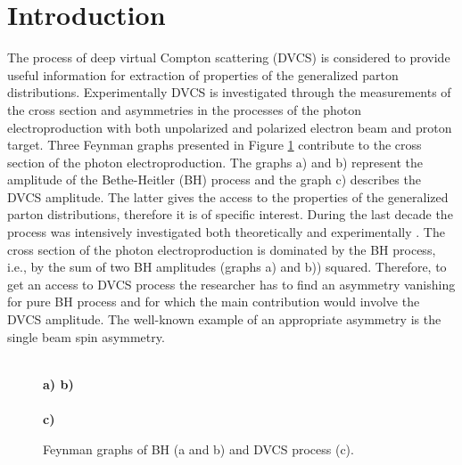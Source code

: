 \documentclass[aps,prd,reprint,groupedaddress,preprintnumbers,showpacs]{revtex4-1}
\begin{document}

\maketitle
\section{\label{Intro}Introduction}

The process of deep virtual Compton scattering
(DVCS) is considered to provide useful information
for extraction of properties of the generalized parton
distributions. Experimentally DVCS is investigated through the measurements of the cross section and asymmetries in the processes of the photon electroproduction with both unpolarized and polarized electron beam and proton target.  Three Feynman graphs presented in Figure \ref{DVCSgraphs} 
contribute
to the cross section of the photon electroproduction. The graphs a) and b) represent the amplitude of the Bethe-Heitler (BH) process and the graph c) describes the DVCS amplitude. The latter gives the access to the properties of the generalized parton distributions, therefore it is of specific interest. During the last decade the process was intensively investigated both theoretically \cite{BelitskyMuller2009PRD,BeMu2010PRD} and experimentally \cite{Girodetal2008PRL}. The cross section of the photon electroproduction is dominated by the BH process, i.e., by the sum of two BH amplitudes (graphs a) and b)) squared.  Therefore, to get an access to DVCS process the researcher has to find an asymmetry vanishing for pure BH process and for which the main contribution would involve the DVCS 
amplitude. 
The well-known example of an appropriate asymmetry is the single beam spin asymmetry. 

\begin{figure}[t]\centering
{}
\hspace{0.4cm}
\\
{\bf a) \hspace{2cm} b)}
\\
\\
{\bf c)}
\caption{\label{DVCSgraphs}Feynman graphs of BH (a and b) and DVCS process (c).}
 \end{figure}
\end{document}
